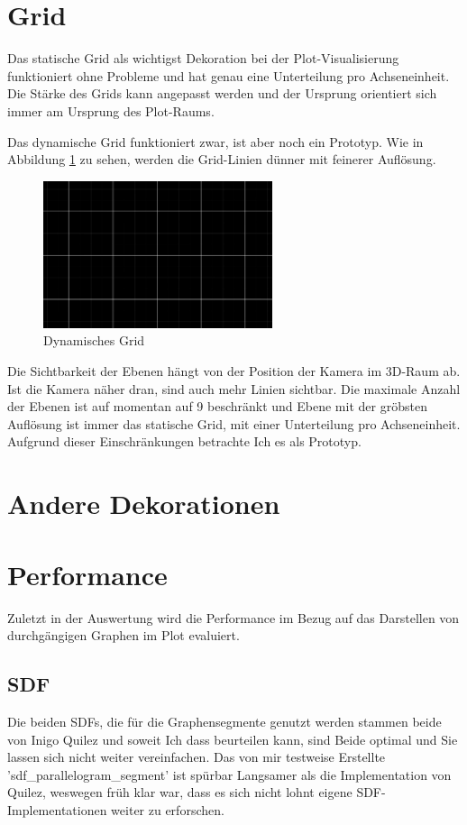 \section{Grid}
Das statische Grid als wichtigst Dekoration bei der Plot-Visualisierung funktioniert ohne Probleme und hat genau eine Unterteilung pro Achseneinheit.
Die Stärke des Grids kann angepasst werden und der Ursprung orientiert sich immer am Ursprung des Plot-Raums.
\par
Das dynamische Grid funktioniert zwar, ist aber noch ein Prototyp.
Wie in Abbildung \ref{fig:grid} zu sehen, werden die Grid-Linien dünner mit feinerer Auflösung.
\begin{figure}[ht]
	\centering
	\includegraphics[width=0.6\textwidth]{fig/grid.png}
	\caption{Dynamisches Grid}
	\label{fig:grid}
\end{figure}
\FloatBarrier
Die Sichtbarkeit der Ebenen hängt von der Position der Kamera im 3D-Raum ab.
Ist die Kamera näher dran, sind auch mehr Linien sichtbar.
Die maximale Anzahl der Ebenen ist auf momentan auf 9 beschränkt und Ebene mit der gröbsten Auflösung ist immer das statische Grid, mit einer Unterteilung pro Achseneinheit.
Aufgrund dieser Einschränkungen betrachte Ich es als Prototyp.

\section{Andere Dekorationen}


\section{Performance}
Zuletzt in der Auswertung wird die Performance im Bezug auf das Darstellen von durchgängigen Graphen im Plot evaluiert.


\subsection{SDF}
Die beiden SDFs, die für die Graphensegmente genutzt werden stammen beide von Inigo Quilez \cite{Inigo} und soweit Ich dass beurteilen kann, sind Beide optimal und Sie lassen sich nicht weiter vereinfachen.
Das von mir testweise Erstellte 'sdf\_parallelogram\_segment' ist spürbar Langsamer als die Implementation von Quilez, weswegen früh klar war, dass es sich nicht lohnt eigene SDF-Implementationen weiter zu erforschen.

